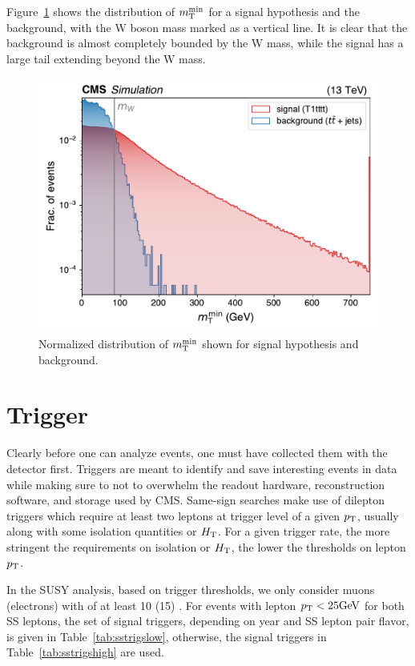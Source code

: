 Figure~\ref{fig:mtminttbar} shows the distribution of $m_{\mathrm{T}}^{\text{min}}$ for a signal hypothesis \Totttt and the
\ttbar background, with the W boson mass marked as a vertical line. It is clear that 
the \ttbar background is almost completely bounded by the W mass, while the signal has a
large tail extending beyond the W mass.

\begin{figure}[!hbtp]
\centering
\includegraphics[width=.70\textwidth]{figs/misc/mtmin_signal_ttbar}
\caption{
    Normalized distribution of $m_{\mathrm{T}}^{\text{min}}$ shown for signal hypothesis \Totttt and 
    \ttbar background.
}
\label{fig:mtminttbar}
\end{figure}

\section{Trigger}

Clearly before one can analyze events, one must have collected them with the detector first.
Triggers are meant to identify and save interesting events in data while making sure to not to overwhelm
the readout hardware, reconstruction software, and storage used by CMS. 
Same-sign searches make use of dilepton triggers
which require at least two leptons at trigger level of a given $p_{\mathrm{T}}$, usually along with some
isolation quantities or $H_{\mathrm{T}}$. For a given trigger rate, 
the more stringent the requirements on isolation or $H_{\mathrm{T}}$, the
lower the thresholds on lepton $p_{\mathrm{T}}$.

In the SUSY analysis, based on trigger thresholds, 
we only consider muons (electrons) with \pt of at least 10 (15) \GeV.
For events with lepton $p_{\mathrm{T}} < 25\text{GeV}$ for both SS leptons, the set of signal triggers, depending on year
and SS lepton pair flavor, is given in Table~\ref{tab:sstrigslow}, otherwise, the signal triggers in 
Table~\ref{tab:sstrigshigh} are used.

